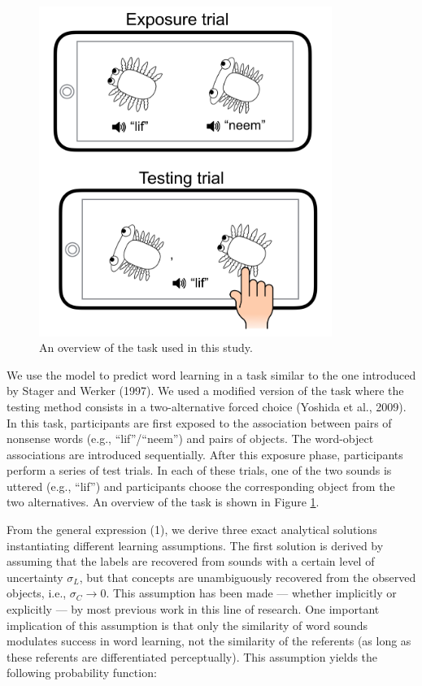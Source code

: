 \documentclass[english,,man,floatsintext]{apa6}
\theoremstyle{definition}
\theoremstyle{definition}
\theoremstyle{definition}
\theoremstyle{remark}
\begin{document}
\begin{figure}[t]

{\centering \includegraphics[width=3.75in]{figs/task} 

}

\caption{An overview of the task used in this study.}\label{fig:task}
\end{figure}

We use the model to predict word learning in a task similar to the one
introduced by Stager and Werker (1997). We used a modified version of
the task where the testing method consists in a two-alternative forced
choice (Yoshida et al., 2009). In this task, participants are first
exposed to the association between pairs of nonsense words (e.g.,
\enquote{lif}/\enquote{neem}) and pairs of objects. The word-object
associations are introduced sequentially. After this exposure phase,
participants perform a series of test trials. In each of these trials,
one of the two sounds is uttered (e.g., \enquote{lif}) and participants
choose the corresponding object from the two alternatives. An overview
of the task is shown in Figure \ref{fig:task}.

From the general expression (1), we derive three exact analytical
solutions instantiating different learning assumptions. The first
solution is derived by assuming that the labels are recovered from
sounds with a certain level of uncertainty \(\sigma_L\), but that
concepts are unambiguously recovered from the observed objects, i.e.,
\(\sigma_C \rightarrow 0\). This assumption has been made --- whether
implicitly or explicitly --- by most previous work in this line of
research. One important implication of this assumption is that only the
similarity of word sounds modulates success in word learning, not the
similarity of the referents (as long as these referents are
differentiated perceptually). This assumption yields the following
probability function:
\end{document}
